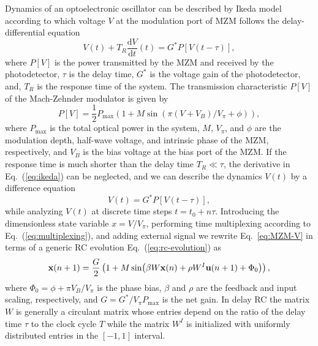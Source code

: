 \documentclass{WileyMSP-template}
\begin{document}
Dynamics of an optoelectronic oscillator can be described by Ikeda model~\cite{ref:ikeda1979,ref:ikeda1980,ref:erneux2004,ref:larger2004} according to which voltage $V$ at the modulation port of MZM follows the delay-differential equation
\begin{equation}
  V(t)+T_R\frac{\mathrm{d}V}{\mathrm{d}t}(t)=G^*P[V(t-\tau)],
\label{eq:ikeda}
\end{equation}
where $P[V]$ is the power transmitted by the MZM and received by the photodetector, $\tau$ is the delay time, $G^*$ is the voltage gain of the photodetector, and, $T_R$ is the response time of the system.
The transmission characteristic $P[V]$ of the Mach-Zehnder modulator is given by~\cite{ref:neyer1982,ref:erneux2004,ref:larger2004}
\begin{equation}
  P[V]=\frac{1}{2}P_\mathrm{max}\left(1+M\sin(\pi(V+V_B)/V_\pi+\phi)\right),
\label{eq:MZM-tf}
\end{equation}
where $P_\mathrm{max}$ is the total optical power in the system, $M$, $V_\pi$, and $\phi$ are the modulation depth, half-wave voltage, and intrinsic phase of the MZM, respectively, and $V_B$ is the bias voltage at the bias port of the MZM.
If the response time is much shorter than the delay time $T_R\ll\tau$, the derivative in Eq.~(\ref{eq:ikeda}) can be neglected, and we can describe the dynamics $V(t)$ by a difference equation~\cite{ref:neyer1982}
\begin{equation}
  V(t)=G^*P[V(t-\tau)],
  \label{eq:MZM-V}
\end{equation}
while analyzing $V(t)$ at discrete time steps $t=t_0+n\tau$.
Introducing the dimensionless state variable $x=V/V_\pi$, performing time multiplexing according to Eq.~(\ref{eq:multiplexing}), and adding external signal we rewrite Eq.~\ref{eq:MZM-V} in terms of a generic RC evolution Eq.~(\ref{eq:rc-evolution}) as
\begin{equation}
  \vb{x}(n+1)=\frac{G}{2}\left(1+M\sin(\beta W\vb{x}(n)+\rho W^I\vb{u}(n+1)+\Phi_0)\right),
  \label{eq:eoo-rc-evolution}
\end{equation}
where $\Phi_0=\phi+\pi V_B/V_\pi$ is the phase bias, $\beta$ and $\rho$ are the feedback and input scaling, respectively, and $G=G^*/V_\pi P_\mathrm{max}$ is the net gain.
In delay RC the matrix $W$ is generally a circulant matrix whose entries depend on the ratio of the delay time $\tau$ to the clock cycle $T$ while the matrix $W^I$ is initialized with uniformly distributed entries in the $[-1, 1]$ interval.
\end{document}
